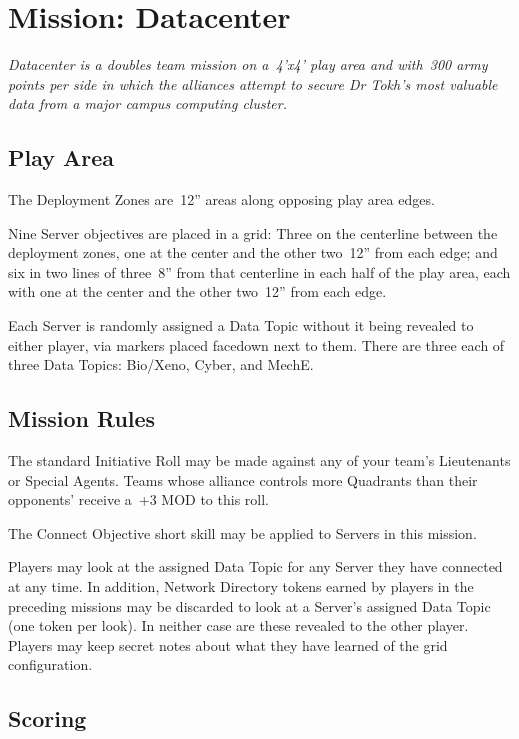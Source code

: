 \chapter{Mission: Datacenter}

\emph{\emph{Datacenter} is a doubles team mission on a~4'x4' play area
  and with~300 army points per side in which the alliances attempt to
  secure Dr Tokh's most valuable data from a major campus computing
  cluster.}

\section{Play Area}

The Deployment Zones are~12'' areas along opposing play area edges.

Nine Server objectives are placed in a grid: Three on the centerline
between the deployment zones, one at the center and the other two~12''
from each edge; and six in two lines of three~8'' from that centerline
in each half of the play area, each with one at the center and the
other two~12'' from each edge.

Each Server is randomly assigned a Data Topic without it being
revealed to either player, via markers placed facedown next to them.
There are three each of three Data Topics: Bio/Xeno, Cyber, and MechE.

\section{Mission Rules}

The standard Initiative Roll may be made against any of your team's
Lieutenants or Special Agents.  Teams whose alliance controls more
Quadrants than their opponents' receive a~+3 MOD to this roll.


The Connect Objective short skill may be applied to Servers in this
mission.

Players may look at the assigned Data Topic for any Server they have
connected at any time.  In addition, Network Directory tokens earned
by players in the preceding missions may be discarded to look at a
Server's assigned Data Topic (one token per look).  In neither case
are these revealed to the other player.  Players may keep secret notes
about what they have learned of the grid configuration.


\section{Scoring}

